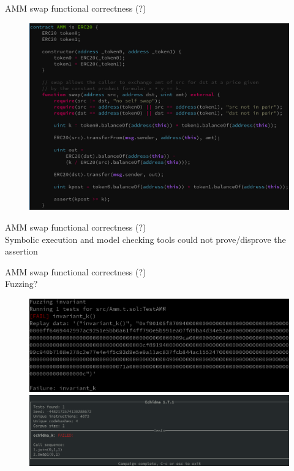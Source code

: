 \documentclass[aspectratio=169,10pt]{beamer}
\begin{document}
\begin{frame}[fragile]
\begin{center}
AMM swap functional correctness (?)
\begin{figure}
	\includegraphics[scale=0.25]{images/amm_fail}
\end{figure}
\end{center}
\end{frame}

\begin{frame}[fragile]
\begin{center}
AMM swap functional correctness (?)\\
Symbolic execution and model checking tools could not prove/disprove the assertion
\end{center}
\end{frame}

\begin{frame}[fragile]
\begin{center}
AMM swap functional correctness (?)\\
Fuzzing?\\
\begin{figure}
\includegraphics[scale=0.2]{images/amm_fail_hevm_run}
\includegraphics[scale=0.2]{images/amm_fail_echidna_run}
\end{figure}
\end{center}
\end{frame}
\end{document}
